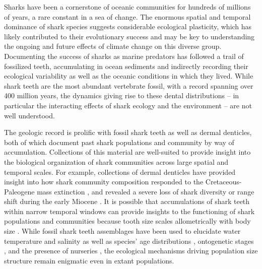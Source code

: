 \documentclass[]{rsos}%
\begin{document}
Sharks have been a cornerstone of oceanic communities for hundreds of millions of years, a rare constant in a sea of change.
The enormous spatial and temporal dominance of shark species suggests considerable ecological plasticity, which has likely contributed to their evolutionary success and may be key to understanding the ongoing and future effects of climate change on this diverse group.
Documenting the success of sharks as marine predators has followed a trail of fossilized teeth, accumulating in ocean sediments and indirectly recording their ecological variability as well as the oceanic conditions in which they lived.
While shark teeth are the most abundant vertebrate fossil, with a record spanning over 400 million years, the dynamics giving rise to these dental distributions -- in particular the interacting effects of shark ecology and the environment -- are not well understood.

The geologic record is prolific with fossil shark teeth as well as dermal denticles, both of which document past shark populations and community by way of accumulation. 
Collections of this material are well-suited to provide insight into the biological organization of shark communities across large spatial and temporal scales.
For example, collections of dermal denticles have provided insight into how shark community composition responded to the Cretaceous- Paleogene mass extinction \cite{sibert2018two}, and revealed a severe loss of shark diversity or range shift during the early Miocene \cite{sibert2021early, naylor2021comment, feichtinger2021comment}.
It is possible that accumulations of shark teeth within narrow temporal windows can  provide insights to the functioning of shark populations and communities because tooth size scales allometrically with body size \cite{Shimada2002, Shimada2004, Shimada2007}.
While fossil shark teeth assemblages have been used to elucidate water temperature and salinity \cite{Kim2014d, zacke2009surface} as well as species' age distributions \cite{Kim2020}, ontogenetic stages \cite{straube2020intraspecific}, and the presence of nurseries \cite{Pimiento2010, herraiz2020use, Villafana2020}, the ecological mechanisms driving population size structure remain enigmatic even in extant populations.
\end{document}
